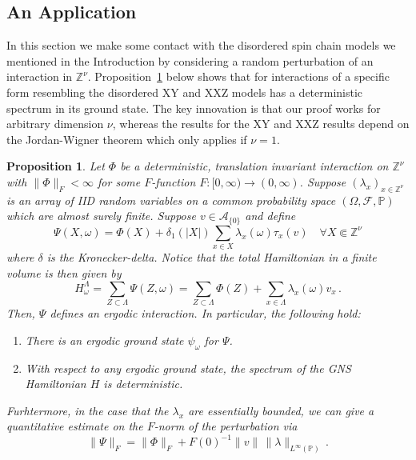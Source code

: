 \documentclass{article}
\newcommand{\Znu}{\mathbb{Z}^\nu}
\newcommand{\Z}{\mathbb Z}
\newcommand{\A}{\mathcal{A}}
\renewcommand{\P}{\mathbb{P}}
\newcommand{\<}{\langle}
\renewcommand{\>}{\rangle}
\newtheorem{prop}[thm]{Proposition}
\theoremstyle{definition}
\numberwithin{equation}{section}
\begin{document}
\subsection{An Application}
In this section we make some contact with the disordered spin chain models we mentioned in the Introduction by considering a random perturbation of an interaction in $\Znu$. Proposition~\ref{prop:apply} below shows that for interactions of a specific form resembling the disordered XY and XXZ models has a deterministic spectrum in its ground state. The key innovation is that our proof works for arbitrary dimension $\nu$, whereas the results for the XY and XXZ results depend on the Jordan-Wigner theorem which only applies if $\nu = 1$. 
\begin{prop}\label{prop:apply}
    Let $\Phi$ be a deterministic, translation invariant interaction on $\Z^\nu$ with $\|\Phi\|_F<\infty$ for some $F$-function $F:[0, \infty) \to (0,\infty)$. Suppose $(\lambda_x)_{x\in \Znu}$ is an array of IID random variables on a common probability space $(\Omega, \mathcal{F}, \P)$ which are almost surely finite. Suppose $v\in \A_{\{0\}}$ and define 
    \begin{equation}
        \Psi(X, \omega) = \Phi(X) + \delta_{1}(|X|)\sum_{x\in X} \lambda_x(\omega) \tau_x(v) \quad \forall X\Subset \Znu
    \end{equation} where $\delta$ is the Kronecker-delta. Notice that the total Hamiltonian in a finite volume is then given by 
    \[
        H^\Lambda_\omega = \sum_{Z\subset \Lambda}\Psi(Z,\omega) = \sum_{Z\subset \Lambda}\Phi(Z) + \sum_{x\in \Lambda} \lambda_x(\omega) v_x\,.
    \] Then, $\Psi$ defines an ergodic interaction. In particular, the following hold:
    \begin{enumerate}
        \item There is an ergodic ground state $\psi_\omega$ for $\Psi$. 
        \item With respect to any ergodic ground state, the spectrum of the GNS Hamiltonian $H$ is deterministic. 
    \end{enumerate} Furhtermore, in the case that the $\lambda_x$ are essentially bounded, we can give a quantitative estimate on the $F$-norm of the perturbation via \[
        \|\Psi\|_F = \|\Phi\|_F + F(0)^{-1} \|v\|\, \|\lambda\|_{L^\infty(\P)}\,.
        \]
\end{prop}
\end{document}
